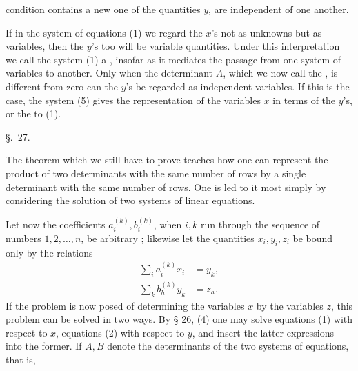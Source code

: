 
condition contains a new one of the quantities \(y\), are independent of one another. 

If in the system of equations (1) we regard the \(x\)'s not as unknowns but as variables, then the \(y\)'s too will be variable quantities. Under this interpretation we call the system (1) a , insofar as it mediates the passage from one system of variables to another. Only when the determinant \(A\), which we now call the , is different from zero can the \(y\)'s be regarded as independent variables. If this is the case, the system (5) gives the representation of the variables \(x\) in terms of the \(y\)'s, or the  to (1).


\begin{center}
{\large \S.\ 27.}

\vspace{0.5em}
{\large{}}
\end{center}

The theorem which we still have to prove teaches how one can represent the product of two determinants with the same number of rows by a single determinant with the same number of rows. One is led to it most simply by considering the solution of two systems of linear equations.

Let now the coefficients $a_i^{(k)}, b_i^{(k)}$, when $i,k$ run through the sequence of numbers $1,2,\ldots,n$, be arbitrary ; likewise let the quantities $x_i,y_i,z_i$ be bound only by the relations
\begin{align}
 \sum_i a_i^{(k)}x_i&=y_k,\tag{1}\\
 \sum_k b_h^{(k)}y_k&=z_h.\tag{2}
\end{align}
If the problem is now posed of determining the variables $x$ by the variables $z$, this problem can be solved in two ways. By § 26, (4) one may solve equations (1) with respect to $x$, equations (2) with respect to $y$, and insert the latter expressions into the former. If $A,B$ denote the determinants of the two systems of equations, that is,
